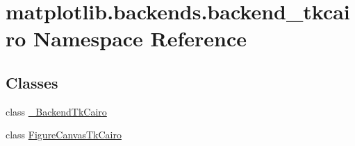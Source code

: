 \hypertarget{namespacematplotlib_1_1backends_1_1backend__tkcairo}{}\section{matplotlib.\+backends.\+backend\+\_\+tkcairo Namespace Reference}
\label{namespacematplotlib_1_1backends_1_1backend__tkcairo}
\subsection*{Classes}
\begin{DoxyCompactItemize}
\item 
class \hyperlink{classmatplotlib_1_1backends_1_1backend__tkcairo_1_1__BackendTkCairo}{\+\_\+\+Backend\+Tk\+Cairo}
\item 
class \hyperlink{classmatplotlib_1_1backends_1_1backend__tkcairo_1_1FigureCanvasTkCairo}{Figure\+Canvas\+Tk\+Cairo}
\end{DoxyCompactItemize}
